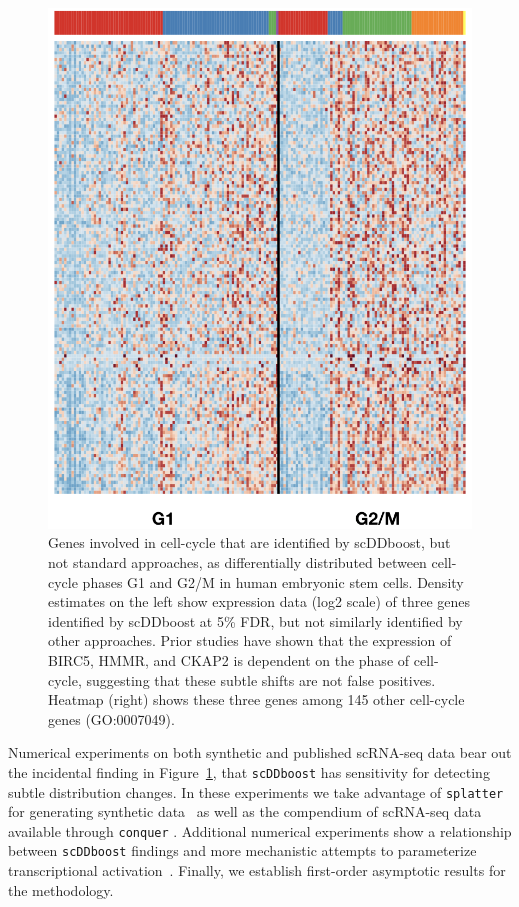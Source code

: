 \documentclass[aoas,preprint]{imsart}
\begin{document}
\begin{figure}[H]
 \includegraphics[clip,width=\textwidth]{Figs/HeatUni.png}
\endminipage

 \caption{Genes involved in cell-cycle that are identified by scDDboost, but not standard approaches,
 as differentially distributed between cell-cycle phases G1 and G2/M in human embryonic stem cells. 
  Density estimates on the left show expression data (log2 scale)
of three genes identified by scDDboost at 5\% FDR, but not similarly identified by other approaches. 
 Prior studies have shown that the expression
 of  BIRC5, HMMR, and CKAP2  is dependent on the phase of cell-cycle,
 suggesting that these subtle shifts are not false positives. 
 Heatmap (right) shows these three genes among 145 other cell-cycle genes (GO:0007049). 
 \label{fig:whet} }
\end{figure}


Numerical experiments  on both synthetic and published scRNA-seq data bear out the incidental finding 
in Figure~\ref{fig:whet}, that \verb+scDDboost+ has sensitivity for detecting subtle distribution changes. 
  In these experiments we take advantage of
\verb+splatter+ for generating synthetic data~\citep{ref:Zappia} as well as the compendium of scRNA-seq
data available through \verb+conquer+ \citep{ref:Cq}.  Additional numerical experiments show a relationship
 between \verb+scDDboost+ findings and more mechanistic attempts to parameterize transcriptional
 activation~\citep{ref:d3e}.  Finally, we establish first-order asymptotic results for the methodology.  
\end{document}
